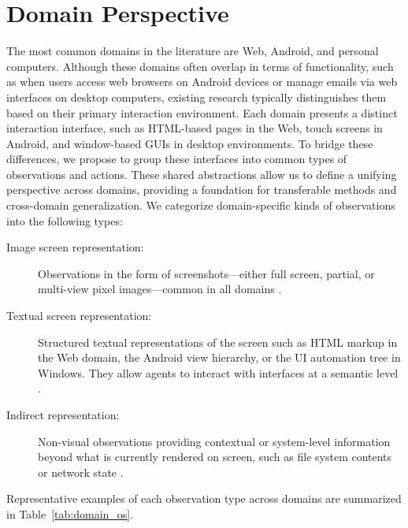 
\section{Domain Perspective}\label{sec:domain_view}
The most common domains in the literature are Web, Android, and personal computers.
Although these domains often overlap in terms of functionality, such as when users access web browsers on Android devices or manage emails via web interfaces on desktop computers, existing research typically distinguishes them based on their primary interaction environment.
Each domain presents a distinct interaction interface, such as HTML-based pages in the Web, touch screens in Android, and window-based GUIs in desktop environments.
To bridge these differences, we propose to group these interfaces into common types of observations and actions. 
These shared abstractions allow us to define a unifying perspective across domains, providing a foundation for transferable methods and cross-domain generalization.
We categorize domain-specific kinds of observations into the following types:
%
    \begin{description}
        \item[Image screen representation:] 
           Observations in the form of screenshots—either full screen, partial, or multi-view pixel images—common in all domains .
        \item[Textual screen representation:] 
            Structured textual representations of the screen such as HTML markup in the Web domain, the Android view hierarchy, or the UI automation tree in Windows. They allow agents to interact with interfaces at a semantic level .
        \item[Indirect representation:] 
            Non-visual observations providing contextual or system-level information beyond what is currently rendered on screen, such as file system contents or network state .
    \end{description}
%
Representative examples of each observation type across domains are summarized in Table~\ref{tab:domain_os}.

